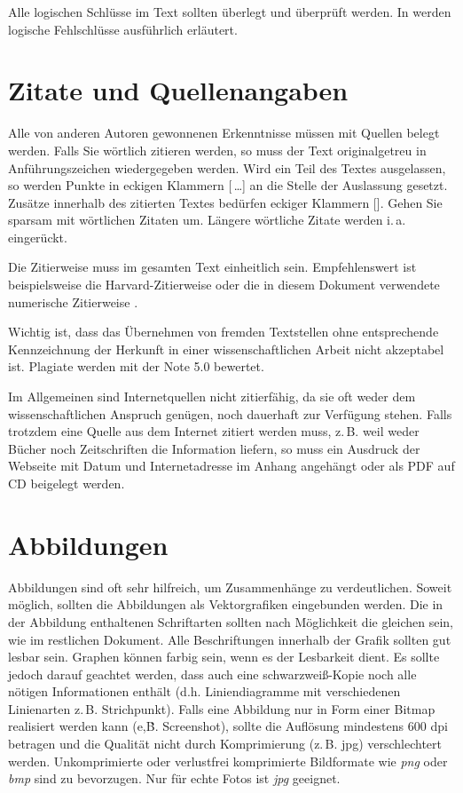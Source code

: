 \documentclass[conference,final,a4paper]{IEEEtran}
\begin{document}
\noindent Alle logischen Schlüsse im Text sollten überlegt und überprüft werden. In \cite{stengel} werden logische Fehlschlüsse ausführlich erläutert.

\section{Zitate und Quellenangaben}
Alle von anderen Autoren gewonnenen Erkenntnisse müssen mit Quellen belegt werden. Falls Sie wörtlich zitieren werden, so muss der Text originalgetreu in Anführungszeichen wiedergegeben werden. Wird ein Teil des Textes ausgelassen, so werden Punkte in eckigen Klammern [\,\dots] an die Stelle der Auslassung gesetzt. Zusätze innerhalb des zitierten Textes bedürfen eckiger Klammern []. Gehen Sie sparsam mit wörtlichen Zitaten um. Längere wörtliche Zitate werden i.\,a. eingerückt.

Die Zitierweise muss im gesamten Text einheitlich sein. Empfehlenswert ist beispielsweise die Harvard-Zitierweise oder die in diesem Dokument verwendete numerische Zitierweise \cite{kornmeier}.

Wichtig ist, dass das Übernehmen von fremden Textstellen ohne entsprechende Kennzeichnung der Herkunft in einer wissenschaftlichen Arbeit nicht akzeptabel ist. Plagiate werden mit der Note 5.0 bewertet.

Im Allgemeinen sind Internetquellen nicht zitierfähig, da sie oft weder dem wissenschaftlichen Anspruch genügen, noch dauerhaft zur Verfügung stehen. Falls trotzdem eine Quelle aus dem Internet zitiert werden muss, z.\,B. weil weder Bücher noch Zeitschriften die Information liefern, so muss ein Ausdruck der Webseite mit Datum und Internetadresse im Anhang angehängt oder als PDF auf CD beigelegt werden.

\section{Abbildungen}
Abbildungen sind oft sehr hilfreich, um Zusammenhänge zu verdeutlichen. Soweit möglich, sollten die Abbildungen als Vektorgrafiken eingebunden werden. Die in der Abbildung enthaltenen Schriftarten sollten nach Möglichkeit die gleichen sein, wie im restlichen Dokument. Alle Beschriftungen innerhalb der Grafik sollten gut lesbar sein.
Graphen können farbig sein, wenn es der Lesbarkeit dient. Es sollte jedoch darauf geachtet werden, dass auch eine schwarz\-weiß-Kopie noch alle nötigen Informationen enthält (d.h. Liniendiagramme mit verschiedenen Linienarten z.\,B. Strichpunkt).  
Falls eine Abbildung nur in Form einer Bitmap realisiert werden kann (e,\.B. Screenshot), sollte die Auflösung mindestens 600 dpi betragen und die Qualität nicht durch Komprimierung (z.\,B. jpg) verschlechtert werden. Unkomprimierte oder verlustfrei komprimierte Bildformate wie \emph{png} oder \emph{bmp} sind zu bevorzugen. Nur für echte Fotos ist \emph{jpg} geeignet.
\end{document}
